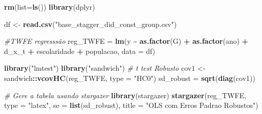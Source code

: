 \documentclass[
]{article}
\author{}
\date{\vspace{-2.5em}}
\newenvironment{Shaded}{\begin{snugshade}}{\end{snugshade}}
\newcommand{\AttributeTok}[1]{\textcolor[rgb]{0.13,0.29,0.53}{#1}}
\newcommand{\CommentTok}[1]{\textcolor[rgb]{0.56,0.35,0.01}{\textit{#1}}}
\newcommand{\FunctionTok}[1]{\textcolor[rgb]{0.13,0.29,0.53}{\textbf{#1}}}
\newcommand{\NormalTok}[1]{#1}
\newcommand{\OtherTok}[1]{\textcolor[rgb]{0.56,0.35,0.01}{#1}}
\newcommand{\SpecialCharTok}[1]{\textcolor[rgb]{0.81,0.36,0.00}{\textbf{#1}}}
\newcommand{\StringTok}[1]{\textcolor[rgb]{0.31,0.60,0.02}{#1}}
\begin{document}
\begin{Shaded}
\begin{Highlighting}[]
\FunctionTok{rm}\NormalTok{(}\AttributeTok{list=}\FunctionTok{ls}\NormalTok{())}
\FunctionTok{library}\NormalTok{(dplyr)}

\NormalTok{df }\OtherTok{\textless{}{-}} \FunctionTok{read.csv}\NormalTok{(}\StringTok{"base\_stagger\_did\_const\_group.csv"}\NormalTok{)}
\end{Highlighting}
\end{Shaded}

\begin{Shaded}
\begin{Highlighting}[]
\CommentTok{\#TWFE regresssão}
\NormalTok{reg\_TWFE }\OtherTok{=} \FunctionTok{lm}\NormalTok{(y }\SpecialCharTok{\textasciitilde{}} \FunctionTok{as.factor}\NormalTok{(G) }\SpecialCharTok{+} \FunctionTok{as.factor}\NormalTok{(ano) }\SpecialCharTok{+}\NormalTok{ d\_x\_t }\SpecialCharTok{+}\NormalTok{ escolaridade }\SpecialCharTok{+}\NormalTok{ populacao, }\AttributeTok{data =}\NormalTok{ df)}

\FunctionTok{library}\NormalTok{(}\StringTok{"lmtest"}\NormalTok{)}
\FunctionTok{library}\NormalTok{(}\StringTok{"sandwich"}\NormalTok{)}
\CommentTok{\# t test Robusto}
\NormalTok{cov1 }\OtherTok{\textless{}{-}}\NormalTok{ sandwich}\SpecialCharTok{::}\FunctionTok{vcovHC}\NormalTok{(reg\_TWFE, }\AttributeTok{type =} \StringTok{"HC0"}\NormalTok{)}
\NormalTok{sd\_robust }\OtherTok{=} \FunctionTok{sqrt}\NormalTok{(}\FunctionTok{diag}\NormalTok{(cov1))}

\CommentTok{\# Gere a tabela usando stargazer}
\FunctionTok{library}\NormalTok{(stargazer)}
\FunctionTok{stargazer}\NormalTok{(reg\_TWFE, }\AttributeTok{type =} \StringTok{"latex"}\NormalTok{, }\AttributeTok{se =} \FunctionTok{list}\NormalTok{(sd\_robust),}
\AttributeTok{title =} \StringTok{"OLS com Erros Padrao Robustos"}\NormalTok{)}
\end{Highlighting}
\end{Shaded}
\end{document}
